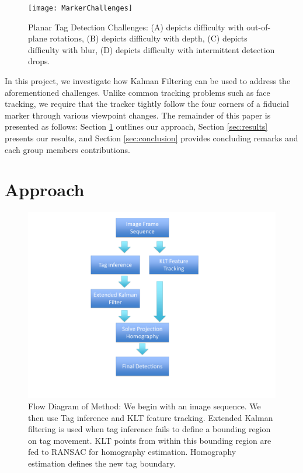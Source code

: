 \documentclass[letterpaper,10pt,conference]{IEEEtran}
\begin{document}
\begin{figure}
\centering
\texttt{[image: MarkerChallenges]}
\caption{Planar Tag Detection Challenges: (A) depicts difficulty with out-of-plane rotations, (B) depicts difficulty with depth, (C) depicts difficulty with blur, (D) depicts difficulty with intermittent detection drops.}
\label{fig:challenges}
\end{figure}

In this project, we investigate how Kalman Filtering can be used to address the aforementioned challenges. Unlike common tracking problems such as face tracking, we require that the tracker tightly follow the four corners of a fiducial marker through various viewpoint changes. The remainder of this paper is presented as follows: Section \ref{sec:approach} outlines our approach, Section \ref{sec:results} presents our results, and Section \ref{sec:conclusion} provides concluding remarks and each group members contributions.



\section{Approach}
\label{sec:approach}
\begin{figure}
\centering
\includegraphics[scale=.15]{flowchart.pdf}
\caption{Flow Diagram of Method: We begin with an image sequence. We then use Tag inference and KLT feature tracking. Extended Kalman filtering is used when tag inference fails to define a bounding region on tag movement. KLT points from within this bounding region are fed to RANSAC for homography estimation. Homography estimation defines the new tag boundary.}
\end{figure}
\end{document}
